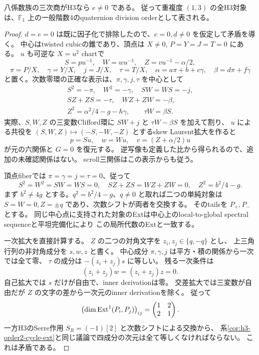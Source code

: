 \begin{theorem}
\label{thm:h3-order2-eight-cone-exclusion}
八係数族の三次商がH3なら $e\ne0$ である。
従って重複度 $(1,3)$ の全H3対象は、$\mathbb F_1$ 上の一般階数4のquaternion division orderとして表される。
\end{theorem}
\begin{proof}
$d=e=0$ は既に因子化で排除したので、$e=0,d\ne0$ を仮定して矛盾を導く。
中心はtwisted cubicの錐であり、頂点は $X\ne0$, $P=Y=J=T=0$ にある。
$u$ も可逆な $X=u^2$ chartで
\[
 S=pu^{-1},\quad W=wu^{-1},\quad Z=vu^{-1}-\alpha/2,
\]
\[
 \pi=P/X,\quad\gamma=Y/X,\quad j=J/X,\quad\tau=T/X,
 \quad\alpha=a\pi+b+c\gamma,\quad\beta=d\pi+f\gamma
\]
と置く。次数零環の正確な表示は、$\pi,\gamma,j,\tau$ を中心として
\begin{equation}\label{eq:h3-order2-cone-X-chart}
 \begin{gathered}
 S^2=-\pi,\quad W^2=-\gamma,\quad SW=WS=-j,\\
 SZ+ZS=-\tau,\quad WZ+ZW=-\beta,\\
 Z^2=\alpha^2/4-g-h\gamma,\qquad \tau W=\beta S.
 \end{gathered}
\end{equation}
実際、$S,W,Z$ の三変数Clifford環に $SW+j$ と $\tau W-\beta S$ を加えて割り、
$u$ による共役を $(S,W,Z)\mapsto(-S,-W,-Z)$ とするskew Laurent拡大を作ると
\[
 p=Su,\quad w=Wu,\quad v=(Z+\alpha/2)u
\]
が元の六関係と $G=0$ を復元する。
逆写像も定義した比から得られるので、追加の未確認関係はない。
scroll三関係はこの表示からも従う。

頂点fiberでは $\pi=\gamma=j=\tau=0$、従って
\[
 S^2=W^2=SW=WS=0,\quad SZ+ZS=WZ+ZW=0,
 \quad Z^2=b^2/4-g.
\]
まず $b^2\ne4g$ とする。$q^2=b^2/4-g$、$q\ne0$ と取れば二つの単純対象は
$S=W=0,Z=\pm q$ であり、次数シフトが両者を交換する。
そのtailsを $P_+,P_-$ とする。
同じ中心点に支持された対象のExtは中心上のlocal-to-global spectral sequenceと平坦完備化により
この局所代数のExtと一致する。

一次拡大を直接計算する。
$Z$ の二つの対角文字を $z_i,z_j\in\{q,-q\}$ とし、
上三角行列の非対角成分を $s,w,z$ と書く。
中心成分 $\pi,\gamma,j$ は平方・積の関係から一次では全て零、
$\tau$ の成分は $-(z_i+z_j)s$ に等しい。
残る一次条件は
\[
 (z_i+z_j)w=(z_i+z_j)z=0.
\]
自己拡大では $s$ だけが自由で、inner derivationは零。
交差拡大では三変数が自由だが $Z$ の文字の差から一次元のinner derivationを除く。
従って
\[
 \bigl(\dim\operatorname{Ext}^1(P_i,P_j)\bigr)_{ij}
 =\begin{pmatrix}1&2\\2&1\end{pmatrix}.
\]
一方H3のSerre作用 $S_R=(-1)[2]$ と次数シフトによる交換から、
系\ref{cor:h3-order2-cycle-ext}と同じ議論で四成分の次元は全て等しくなければならない。
これは矛盾である。


\end{proof}
